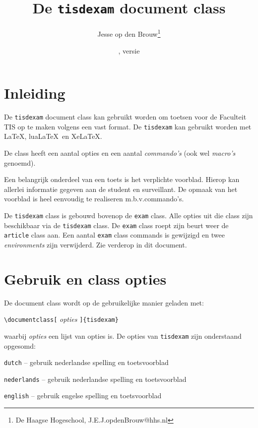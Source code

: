\documentclass[12pt,dutch,addpoints,fleqn]{tisdexam}
\newcommand\DocClass[1]{\texttt{#1}}
\newcommand\Option[1]{\texttt{#1}}
\begin{document}
\raggedbottom
\title{De \DocClass{tisdexam} document class}
\author{Jesse op den Brouw\thanks{De Haagse Hogeschool,
        {J.E.J.opdenBrouw@hhs.nl}}}
\date{\tisdexamfiledate, versie \tisdexamfileversion}
\maketitle
\setcounter{footnote}{1}


\section{Inleiding}
\label{sec:abstract}
De \DocClass{tisdexam} document class kan gebruikt worden om toetsen voor
de Faculteit TIS op te maken volgens een vast format. De \DocClass{tisdexam}
kan gebruikt worden met \LaTeX, lua\LaTeX\ en Xe\LaTeX.

\medskip
De class heeft een aantal opties en een aantal \textsl{commando's} (ook wel
\textsl{macro's} genoemd).

\medskip
Een belangrijk onderdeel van een toets is het verplichte voorblad. Hierop kan
allerlei informatie gegeven aan de student en surveillant. De opmaak van het
voorblad is heel eenvoudig te realiseren m.b.v.\@ commando's.

\medskip
De \DocClass{tisdexam} class is gebouwd bovenop de \DocClass{exam}
class. Alle opties uit die class zijn beschikbaar via de
\DocClass{tisdexam} class. De \DocClass{exam} class roept zijn
beurt weer de \DocClass{article} class aan.
Een aantal \DocClass{exam} class commands is gewijzigd en twee
\textsl{environments} zijn verwijderd. Zie verderop in dit document.


\section{Gebruik en class opties}
De document class wordt op de gebruikelijke manier geladen met:
\bigskip

\verb|\documentclass[| \textsl{opties} \verb|]{tisdexam}|
\bigskip

\noindent
waarbij \textsl{opties} een lijst van opties is. De opties van \DocClass{tisdexam} zijn
onderstaand opgesomd:
\smallskip

\Option{dutch} -- gebruik nederlandse spelling en toetsvoorblad

\Option{nederlands} -- gebruik nederlandse spelling  en toetsvoorblad

\Option{english} -- gebruik engelse spelling en toetsvoorblad
\end{document}
